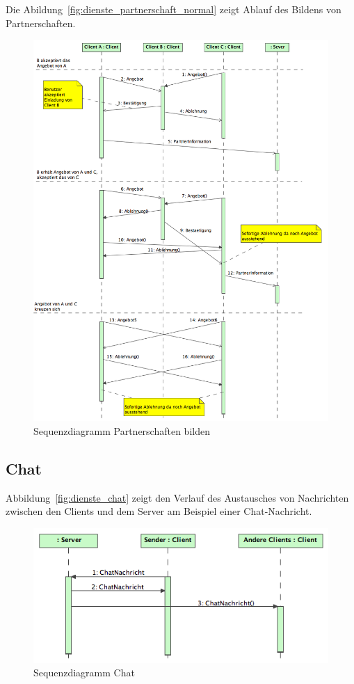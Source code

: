 \documentclass[12pt,halfparskip]{scrartcl}
\begin{document}
Die Abildung~\vref{fig:dienste_partnerschaft_normal} zeigt Ablauf des Bildens von Partnerschaften.
\begin{figure}[h]
	\centering
	\includegraphics[width=\textwidth]{dienste_partnerschaft_normal}
	\caption{Sequenzdiagramm Partnerschaften bilden}
	\label{fig:dienste_partnerschaft_normal}
\end{figure}

\clearpage
\subsection{Chat} %
\label{sub:nachrichtenaustausch_zwischen_client_und_server}
Abbildung~\vref{fig:dienste_chat} zeigt den Verlauf des Austausches von Nachrichten zwischen den Clients und dem Server am Beispiel einer Chat-Nachricht.
\begin{figure}[h]
	\centering
	\includegraphics[width=\textwidth]{dienste_chat}
	\caption{Sequenzdiagramm Chat}
	\label{fig:dienste_chat}
\end{figure}
\clearpage
\end{document}
